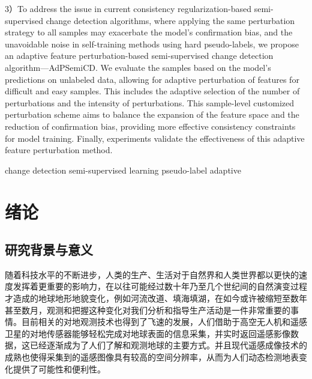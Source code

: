 \documentclass[lang=chs, degree=master, blindreview=false, adobe=false]{yanputhesis}
\begin{document}
\begin{engabstract}
  3）To address the issue in current consistency regularization-based semi-supervised change detection algorithms, where applying the same perturbation strategy to all samples may exacerbate the model’s confirmation bias, and the unavoidable noise in self-training methods using hard pseudo-labels, we propose an adaptive feature perturbation-based semi-supervised change detection algorithm—AdPSemiCD. We evaluate the samples based on the model's predictions on unlabeled data, allowing for adaptive perturbation of features for difficult and easy samples. This includes the adaptive selection of the number of perturbations and the intensity of perturbations. This sample-level customized perturbation scheme aims to balance the expansion of the feature space and the reduction of confirmation bias, providing more effective consistency constraints for model training. Finally, experiments validate the effectiveness of this adaptive feature perturbation method.
    \begin{engkeywords}                                     %
        change detection \ensep semi-supervised learning \ensep pseudo-label     \ensep      adaptive     %
    \end{engkeywords}                                       %
\end{engabstract}                                           %
\tableofcontents                                            %
\listoffigures                                              %
\listoftables                                               %
\printnomenclature                                          %
\mainmatter
\sDefault
\chapter{绪论}
\section{研究背景与意义}
随着科技水平的不断进步，人类的生产、生活对于自然界和人类世界都以更快的速度发挥着更重要的影响力，在以往可能经过数十年乃至几个世纪间的自然演变过程才造成的地球地形地貌变化，例如河流改道、填海填湖，在如今或许被缩短至数年甚至数月，观测和把握这种变化对我们分析和指导生产活动是一件非常重要的事情。目前相关的对地观测技术也得到了飞速的发展，人们借助于高空无人机和遥感卫星的对地传感器能够轻松完成对地球表面的信息采集，并实时返回遥感影像数据，这已经逐渐成为了人们了解和观测地球的主要方式。并且现代遥感成像技术的成熟也使得采集到的遥感图像具有较高的空间分辨率，从而为人们动态检测地表变化提供了可能性和便利性。
\end{document}

